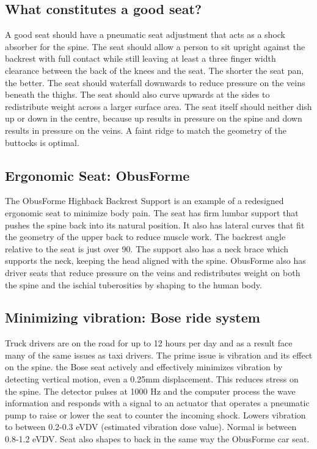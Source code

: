 \documentclass[11pt]{article}
\begin{document}
\subsection{What constitutes a good seat?}
A good seat should have a pneumatic seat adjustment that acts as a shock absorber for the spine. The seat 
should allow a person to sit upright against the backrest with full contact while still leaving at least a 
three finger width clearance between the back of the knees and the seat. The shorter the seat pan, the better. 
The seat should waterfall downwards to reduce pressure on the veins beneath the thighs. The seat should also curve 
upwards at the sides to redistribute weight across a larger surface area. The seat itself should neither dish 
up or down in the centre, because up results in pressure on the spine and down results in pressure on the veins. 
A faint ridge to match the geometry of the buttocks is optimal\cite{ergoCentricchair2011, Natpost2005}.


\subsection{Ergonomic Seat: ObusForme}
The ObusForme Highback Backrest Support is an example of a redesigned ergonomic seat to minimize body pain. 
The seat has firm lumbar support that pushes the spine back into its natural position. 
It also has lateral curves that fit the geometry of the upper back to reduce muscle work\cite{ObusFormebackrest}. 
The backrest angle relative to the seat is just over 90\textdegree. The support also has a neck brace which supports
the neck, keeping the head aligned with the spine\cite{ObusFormedriverchair}.
ObusForme also has driver seats that reduce pressure on the veins and redistributes weight 
on both the spine and the ischial tuberosities by shaping to the human body\cite{ObusFormecushion}.

\subsection{Minimizing vibration: Bose ride system}
Truck drivers are on the road for up to 12 hours per day and as a result face many of the same issues as taxi drivers. 
The prime issue is vibration and its effect on the spine. the Bose seat actively and effectively minimizes vibration 
by detecting vertical motion, even a 0.25mm displacement. This reduces stress on the spine. 
The detector pulses at 1000 Hz and the computer process the 
wave information and responds with a signal to an actuator that operates a pneumatic pump to raise or lower the seat to 
counter the incoming shock. Lowers vibration to between 0.2-0.3 eVDV (estimated vibration dose value). Normal is 
between 0.8-1.2 eVDV\cite{Bosetruckseat}. Seat also shapes to back in the same way the 
ObusForme car seat\cite{Bosetruckseat}.
\end{document}

